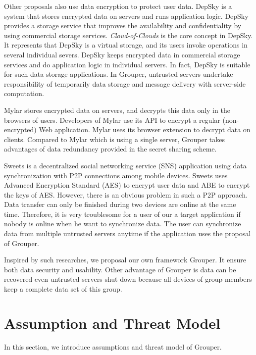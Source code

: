 \documentclass[twocolumn,10pt]{article}
\begin{document}
Other proposals also use data encryption to protect user data.
DepSky\cite{bessani2013depsky} is a system that stores encrypted data on servers and runs application logic. 
DepSky provides a storage service that improves the availability and confidentiality by using commercial storage services. 
\emph{Cloud-of-Clouds} is the core concept in DepSky. 
It represents that DepSky is a virtual storage, and its users invoke operations in several individual severs. 
DepSky keeps encrypted data in commercial storage services and do application logic in individual servers.
In fact, DepSky is suitable for such data storage applications. 
In Grouper, untrusted servers undertake responsibility of temporarily data storage and message delivery with server-side computation.

Mylar\cite{popa2014building} stores encrypted data on servers, and decrypts this data only in the browsers of users. 
Developers of Mylar use its API to encrypt a regular (non-encrypted) Web application. 
Mylar uses its browser extension to decrypt data on clients. 
Compared to Mylar which is using a single server, Grouper takes advantages of data redundancy provided in the secret sharing scheme.

Sweets\cite{sweets} is a decentralized social networking service (SNS) application using data synchronization with P2P connections among mobile devices. 
Sweets uses Advanced Encryption Standard (AES) to encrypt user data and ABE to encrypt the keys of AES. 
However, there is an obvious problem in such a P2P approach. 
Data transfer can only be finished during two devices are online at the same time. 
Therefore, it is very troublesome for a user of our a target application if nobody is online when he want to synchronize data.
The user can synchronize data from multiple untrusted servers anytime if the application uses the proposal of Grouper.

Inspired by such researches, we proposal our own framework Grouper.
It ensure both data security and usability.
Other advantage of Grouper is data can be recovered even untrusted servers shut down because all devices of group members keep a complete data set of this group.

\section{Assumption and Threat Model}

In this section, we introduce assumptions and threat model of Grouper.
\end{document}
